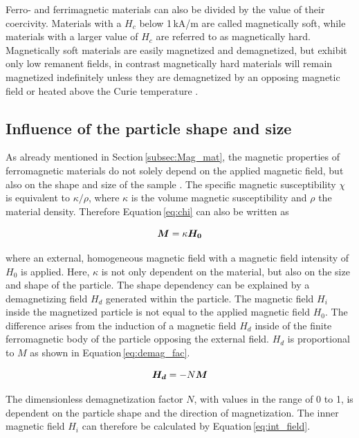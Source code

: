 Ferro- and ferrimagnetic materials can also be divided by the value of their coercivity. Materials with a $H_{c}$ below 1\,kA/m are called magnetically soft, while materials with a larger value of $H_{c}$ are referred to as magnetically hard. Magnetically soft materials are easily magnetized and demagnetized, but exhibit only low remanent fields, in contrast magnetically hard materials will remain magnetized indefinitely unless they are demagnetized by an opposing magnetic field or heated above the Curie temperature \cite{meschede2015gerthsen}\cite{michalowsky2006magnettechnik}. 

\subsection{Influence of the particle shape and size}
\label{subsec:part_shape}
As already mentioned in Section\,\ref{subsec:Mag_mat}, the magnetic properties of ferromagnetic materials do not solely depend on the applied magnetic field, but also on the shape and size of the sample \cite{gomez2009influence}. The specific magnetic susceptibility $\chi$ is equivalent to $\kappa/\rho$, where $\kappa$ is the volume magnetic susceptibility and $\rho$ the material density. Therefore Equation\,\ref{eq:chi} can also be written as

\begin{equation}
\label{eq:kappa}
\centering
\boldsymbol{M} = \kappa\boldsymbol{H_{0}}
\end{equation}

where an external, homogeneous magnetic field with a magnetic field intensity of $H_{0}$ is applied. Here, $\kappa$ is not only dependent on the material, but also on the size and shape of the particle. The shape dependency can be explained by a demagnetizing field $H_{d}$ generated within the particle. The magnetic field $H_{i}$ inside the magnetized particle is not equal to the applied magnetic field $H_{0}$. The difference arises from the induction of a magnetic field $H_{d}$ inside of the finite ferromagnetic body of the particle opposing the external field. $H_{d}$ is proportional to $M$ as shown in Equation\,\ref{eq:demag_fac}. 

\begin{equation}
\label{eq:demag_fac}
\centering
\boldsymbol{H_{d}} = -N\boldsymbol{M}
\end{equation}

The dimensionless demagnetization factor $N$, with values in the range of 0 to 1, is dependent on the particle shape and the direction of magnetization. The inner magnetic field $H_{i}$ can therefore be calculated by Equation\,\ref{eq:int_field}. 

